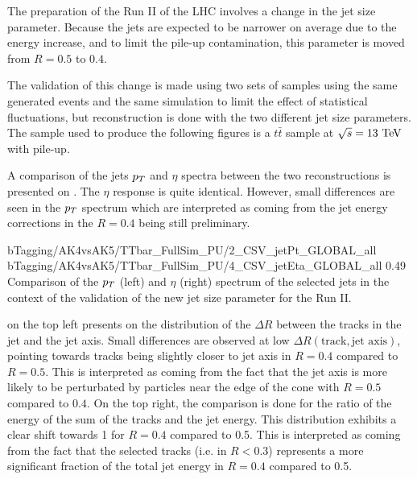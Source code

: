     The preparation of the Run II of the LHC involves a change in the jet size parameter.
    Because the jets are expected to be narrower on average due to the energy increase,
    and to limit the pile-up contamination, this parameter is moved from $R = 0.5$ to $0.4$.

    The validation of this change is made using two sets of samples using the same
    generated events and the same simulation to limit the effect of statistical fluctuations,
    but reconstruction is done with the two different jet size parameters. The sample
    used to produce the following figures is a $t\bar{t}$ sample at $\sqrt{s} = 13~\text{TeV}$
    with pile-up.

    A comparison of the jets $p_T$ and $\eta$ spectra between the two reconstructions
    is presented on . The
    $\eta$ response is quite identical. However, small differences are seen in the $p_T$
    spectrum which are interpreted as coming from the jet energy corrections in the
    $R = 0.4$ being still preliminary.

                     {bTagging/AK4vsAK5/TTbar_FullSim_PU/2_CSV_jetPt_GLOBAL_all}
                     {bTagging/AK4vsAK5/TTbar_FullSim_PU/4_CSV_jetEta_GLOBAL_all}
                     {0.49}
                     {Comparison of the $p_T$ (left) and $\eta$ (right) spectrum of
                     the selected jets in the context of the validation of the new
                     jet size parameter for the Run II.}

     on the top left
    presents on the distribution of the $\Delta R$ between the tracks in the jet
    and the jet axis. Small differences are observed
    at low $\Delta R(\text{track},\text{jet axis})$, pointing towards tracks being slightly
    closer to jet axis in $R = 0.4$ compared to $R = 0.5$. This is interpreted as coming
    from the fact that the jet axis is more likely to be perturbated by particles near
    the edge of the cone with $R = 0.5$ compared to $0.4$.
    On the top right, the comparison is done for the ratio of the energy of the sum
    of the tracks and the jet energy. This distribution exhibits a clear shift towards
    1 for $R = 0.4$ compared to 0.5. This is interpreted as coming from the fact that
    the selected tracks (i.e. in $R < 0.3$) represents a more significant fraction of
    the total jet energy in $R = 0.4$ compared to 0.5.

